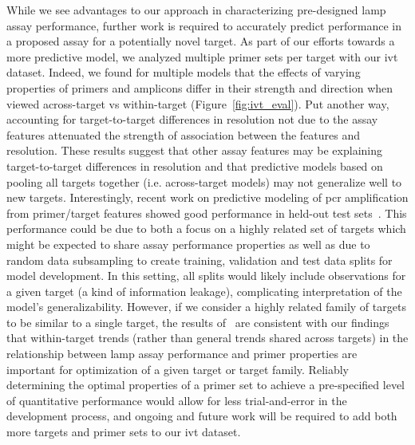 \documentclass[../thesis.tex]{subfiles}
\begin{document}
While we see advantages to our approach in characterizing pre-designed \gls{lamp} assay performance, further work is required to accurately predict performance in a proposed assay for a potentially novel target. As part of our efforts towards a more predictive model, we analyzed multiple primer sets per target with our \gls{ivt}  dataset. Indeed, we found for multiple models that the effects of varying properties of primers and amplicons differ in their strength and direction when viewed across-target vs within-target (Figure~\ref{fig:ivt_eval}). Put another way, accounting for target-to-target differences in resolution not due to the assay features attenuated the strength of association between the features and resolution. These results suggest that other assay features may be explaining target-to-target differences in resolution and that predictive models based on pooling all targets together (i.e. across-target models) may not generalize well to new targets. Interestingly, recent work on predictive modeling of \gls{pcr} amplification from primer/target features showed good performance in held-out test sets~\citep{doring_modeling_2019}. This performance could be due to both a focus on a highly related set of targets which might be expected to share assay performance properties as well as due to random data subsampling to create training, validation and test data splits for model development. In this setting, all splits would likely include observations for a given target (a kind of information leakage), complicating interpretation of the model's generalizability. However, if we consider a highly related family of targets to be similar to a single target, the results of~\citet{doring_modeling_2019} are consistent with our findings that within-target trends (rather than general trends shared across targets) in the relationship between \gls{lamp} assay performance and primer properties are important for optimization of a given target or target family. Reliably determining the optimal properties of a primer set to achieve a pre-specified level of quantitative performance would allow for less trial-and-error in the development process, and ongoing and future work will be required to add both more targets and primer sets to our \gls{ivt}  dataset.
\end{document}
